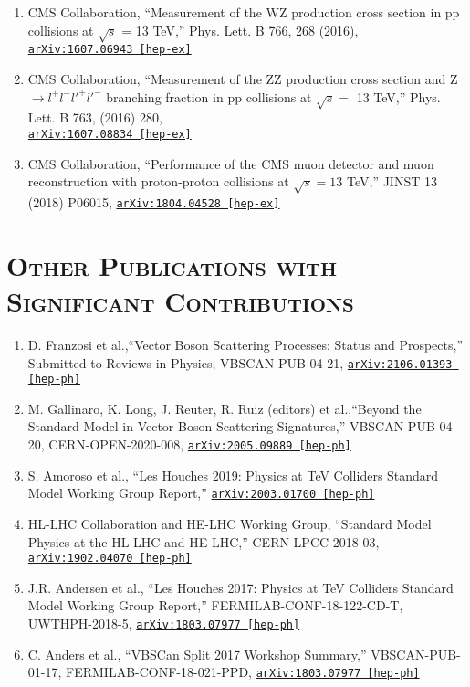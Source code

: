 \documentclass[10pt]{res} %
\begin{document}
\begin{resume}
\begin{enumerate}
  \item CMS Collaboration, ``Measurement of the WZ production cross section in pp collisions at $\sqrt{s}$ = 13 TeV,''
Phys. Lett. B 766, 268 (2016), \href{https://arxiv.org/abs/1607.06943}{\texttt{arXiv:1607.06943 [hep-ex]}}
  \item CMS Collaboration, ``Measurement of the ZZ production cross section and Z $\rightarrow l^{+}l^{-}l'^{+}l'^{-}$ branching fraction in pp collisions at $\sqrt{s} =$ 13 TeV,''
Phys. Lett. B 763, (2016) 280, \\ \href{https://arxiv.org/abs/1607.08834} {\texttt{arXiv:1607.08834 [hep-ex]}}
  \item CMS Collaboration, ``Performance of the CMS muon detector and muon reconstruction with proton-proton collisions at $\sqrt{s} = 13$ TeV,''
JINST 13 (2018) P06015, \href{https://arxiv.org/abs/1804.04528} {\texttt{arXiv:1804.04528 [hep-ex]}}
\end{enumerate}

\section{\textsc{Other Publications with Significant Contributions}}
\begin{enumerate}
  \item D. Franzosi et al.,``Vector Boson Scattering Processes: Status and Prospects,''
    Submitted to Reviews in Physics, VBSCAN-PUB-04-21, \href{https://arxiv.org/abs/2106.01393}{\texttt{arXiv:2106.01393 [hep-ph]}}
  \item M. Gallinaro, K. Long, J. Reuter, R. Ruiz (editors) et al.,``Beyond the Standard Model in Vector Boson Scattering Signatures,''
    VBSCAN-PUB-04-20, CERN-OPEN-2020-008, \href{https://arxiv.org/abs/2005.09889}{\texttt{arXiv:2005.09889 [hep-ph]}}
  \item S. Amoroso et al., ``Les Houches 2019: Physics at TeV Colliders Standard Model Working Group Report,''
    \href{https://arxiv.org/abs/2003.01700 } {\texttt{arXiv:2003.01700 [hep-ph]}}
  \item HL-LHC Collaboration and HE-LHC Working Group, ``Standard Model Physics at the HL-LHC and HE-LHC,''
    CERN-LPCC-2018-03, \href{https://arxiv.org/abs/1902.04070}{\texttt{arXiv:1902.04070 [hep-ph]}}
  \item J.R. Andersen et al., ``Les Houches 2017: Physics at TeV Colliders Standard Model Working Group Report,''
    FERMILAB-CONF-18-122-CD-T, UWTHPH-2018-5, \href{https://arxiv.org/abs/1803.07977}{\texttt{arXiv:1803.07977 [hep-ph]}}
  \item C. Anders et al., ``VBSCan Split 2017 Workshop Summary,'' 
    VBSCAN-PUB-01-17, FERMILAB-CONF-18-021-PPD, \href{https://arxiv.org/abs/1801.04203}{\texttt{arXiv:1803.07977  [hep-ph]}}
\end{enumerate}


\end{resume}
\end{document}
